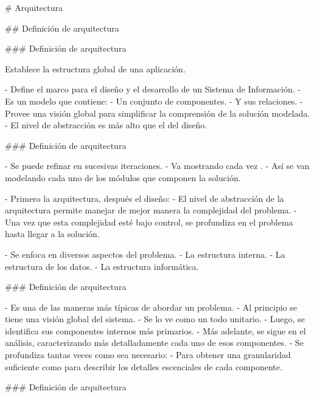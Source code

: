 # Arquitectura

## Definición de arquitectura

### Definición de arquitectura

\vspace{-0.5em}
\buildrboxx{}
Establece la estructura global de una aplicación.
\finishrboxx

- Define el marco para el diseño y el desarrollo de un Sistema de Información.
    - Es un modelo que contiene:
        - Un conjunto de componentes.
        - Y sus relaciones.
    - Provee una visión global para simplificar la comprensión de la solución modelada.
- El nivel de abstracción es más alto que el del diseño.

### Definición de arquitectura


- Se puede refinar en sucesivas iteraciones.
    - Va mostrando cada vez .
    - Así se van modelando cada uno de los módulos que componen la solución.

- Primero la arquitectura, después el diseño:
    - El nivel de abstracción de la arquitectura permite manejar de mejor manera la complejidad
    del problema.
    - Una vez que esta complejidad esté bajo control, se profundiza en el
    problema hasta llegar a la solución.

- Se enfoca en diversos aspectos del problema.
    - La estructura interna.
    - La estructura de los datos.
    - La estructura informática.

### Definición de arquitectura


- Es una de las maneras más típicas de abordar un problema.
- Al principio se tiene una visión global del sistema.
    - Se lo ve como un todo unitario.
- Luego, se identifica sus componentes internos más primarios.
- Más adelante, se sigue  en el análisis,
caracterizando más detalladamente cada uno de esos componentes.
- Se profundiza tantas veces como sea necesario:
    - Para obtener una granularidad suficiente como para describir los
    detalles escenciales de cada componente.

### Definición de arquitectura


